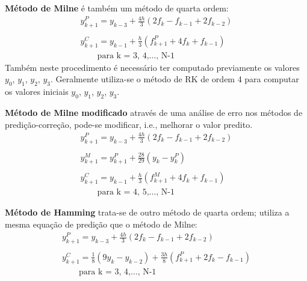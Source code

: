 \textbf{Método de Milne} é também um método de quarta ordem: 
\begin{equation*}
\begin{split}
y^{P}_{k+1} = y_{k-3} + \frac{4h}{3}(2f_{k} - f_{k-1} + 2f_{k-2})\\
\\
y^{C}_{k+1} = y_{k-1} + \frac{h}{3}(f^{P}_{k+1} + 4f_{k} + f_{k-1})\\
\qquad \text{para k = 3, 4,$\dotsc$, N-1}
\end{split}
\end{equation*}
Também neste procedimento é necessário ter computado previamente os valores $y_{0}$, $y_{1}$, $y_{2}$, $y_{3}$.
Geralmente utiliza-se o método de RK de ordem 4 para computar os valores iniciais $y_{0}$, $y_{1}$, $y_{2}$, $y_{3}$.

\textbf{Método de Milne modificado} através de uma análise de erro nos métodos
de predição-correção, pode-se modificar, i.e., melhorar o valor predito. 
\begin{equation*}
\begin{split}
y^{P}_{k+1} = y_{k-3} + \frac{4h}{3}(2f_{k} - f_{k-1} + 2f_{k-2})\\
\\
y^{M}_{k+1} = y^{P}_{k+1} + \frac{28}{29}(y_{k} - y^{P}_{k})\\
\\
y^{C}_{k+1} = y_{k-1} + \frac{h}{3}(f^{M}_{k+1} + 4f_{k} + f_{k-1})\\
\qquad \text{para k = 4, 5,$\dotsc$, N-1}
\end{split}
\end{equation*} 

\textbf{Método de Hamming} trata-se de outro método de quarta ordem; utiliza
a mesma equação de predição que o método de Milne:
\begin{equation*}
\begin{split}
y^{P}_{k+1} = y_{k-3} + \frac{4h}{3}(2f_{k} - f_{k-1} + 2f_{k-2})\\
\\
y^{C}_{k+1} = \frac{1}{8}(9y_{k} - y_{k-2}) + \frac{3h}{8}(f^{P}_{k+1} + 2f_{k} - f_{k-1})\\
\qquad \text{para k = 3, 4,$\dotsc$, N-1}
\end{split}
\end{equation*}

